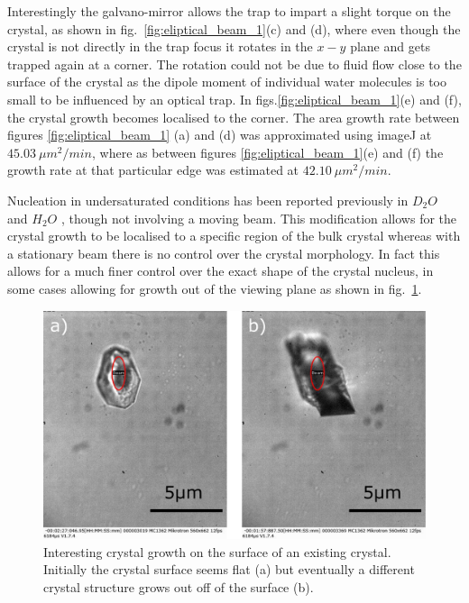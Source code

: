 Interestingly the galvano-mirror allows the trap to 
impart a slight torque on the crystal, as shown in fig.~\ref{fig:eliptical_beam_1}(c) and (d), where even 
though the crystal is not directly in the trap focus 
it rotates in the $x-y$ plane and gets trapped again 
at a corner. The rotation could not be due to fluid 
flow close to the surface of the crystal as the 
dipole moment of individual water molecules is too 
small to be influenced by an optical trap. In figs.\ref{fig:eliptical_beam_1}(e) and (f), the 
crystal growth becomes localised to the corner. The 
area growth rate between figures \ref{fig:eliptical_beam_1}
(a) and (d) was approximated using imageJ at $45.03\ 
\mu m^2 /min$, where as between figures 
\ref{fig:eliptical_beam_1}(e) and (f) the growth rate 
at that particular edge was estimated at $42.10\ \mu m^2/min$. 
 
Nucleation in undersaturated conditions has been 
reported previously in $D_2O$ \cite{Rungsimanon2010} 
and $H_2O$ \cite{Flannigan2023}, though not involving 
a moving beam. This modification allows for the crystal 
growth to be localised to a specific region of the bulk 
crystal whereas with a stationary beam there is no 
control over the crystal morphology. In fact this allows 
for a much finer control over the exact shape of the 
crystal nucleus, in some cases allowing for growth out
of the viewing plane as shown in fig.~\ref{fig:out_of_plane}.
\begin{figure}[h!]
	\centering
	\includegraphics[width=\linewidth]{out_of_plane.pdf}
	\caption{Interesting crystal growth on the surface of an
	existing crystal. Initially the crystal surface seems 
	flat (a) but eventually a different crystal structure 
	grows out off of the surface (b).}
	\label{fig:out_of_plane}
\end{figure}

